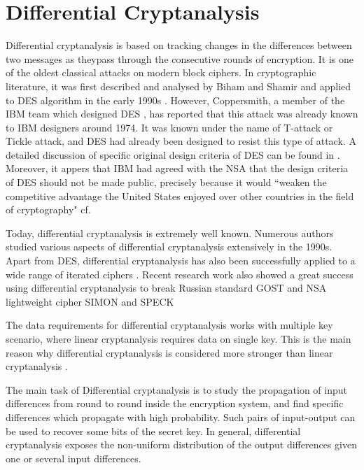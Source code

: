 \section{Differential Cryptanalysis}
Differential cryptanalysis is based on tracking changes in the differences between two messages as theypass through the consecutive rounds of encryption. It is one of the oldest classical attacks on modern block ciphers. In cryptographic literature, it was first described and analysed by Biham and Shamir and applied to DES algorithm in the early 1990s \cite{biham1993differential}. However, Coppersmith, a member of the IBM team which designed DES \cite{coppersmith1994data,coppersmith2000development,courtois2003s}, has reported that this attack was already known to IBM designers around 1974. It was known under the name of T-attack or Tickle attack, and DES had already been designed to resist this type of attack. A detailed discussion of specific original design criteria of DES can be found in \cite{courtois2003s}. Moreover, it appers that IBM had agreed with the NSA that the design criteria of DES should not be made public, precisely because it would ``weaken the competitive advantage the United States enjoyed over other countries in the field of cryptography" cf. \cite{coppersmith1994data,coppersmith2000development} 

Today, differential cryptanalysis is extremely well known. Numerous authors studied various aspects of differential cryptanalysis extensively in the 1990s. Apart from DES, differential cryptanalysis has also been successfully applied to a wide range of iterated ciphers \cite{knudsen1993cryptanalysis,massey1994safer}.  Recent research work also showed a great success using differential cryptanalysis to break Russian standard GOST  \cite{gostdc0,gostdc1} and NSA lightweight cipher SIMON and SPECK \cite{biryukov2014differential,alkhzaimi2013cryptanalysis}

The data requirements for differential cryptanalysis works with multiple key scenario, where linear cryptanalysis requires data on single key. This is the main reason why differential cryptanalysis is considered more stronger than linear cryptanalysis \cite{courtois2005best}.

The main task of Differential cryptanalysis is to study the propagation of input differences from round to round inside the encryption system, and find specific differences which propagate with high probability. Such pairs of input-output can be used to recover some bits of the secret key. In general, differential cryptanalysis exposes the non-uniform distribution of the output differences given one or several input differences.

